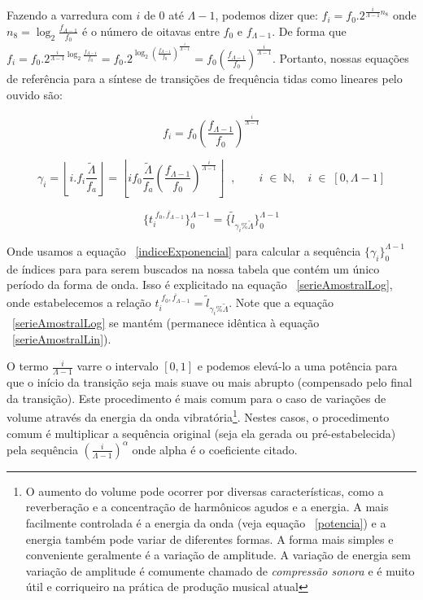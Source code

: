 Fazendo a varredura com $i$
de $0$ até $\Lambda-1$, podemos dizer que: $f_i=f_0 . 2^{\frac{i}{\Lambda-1} n_8}$ onde 
$n_8=\log_2\frac{f_{\Lambda-1}}{f_0}$ é o número de oitavas entre $f_0$ e $f_{\Lambda-1}$.
De forma que $f_i=f_0 . 2^{\frac{i}{\Lambda-1}\log_2\frac{f_{\Lambda-1}}{f_0}}=
f_0 . 2^{\log_2\left ( \frac{f_{\Lambda-1}}{f_0} \right )^{\frac{i}{\Lambda-1}}}=
f_0 \left ( \frac{f_{\Lambda-1}}{f_0} \right ) ^{\frac{i}{\Lambda -1}}$. Portanto,
nossas equações de referência para a síntese de transições de frequência tidas como
lineares pelo ouvido são:

\begin{equation}
f_i=f_0 \left ( \frac{f_{\Lambda-1}}{f_0} \right ) ^{\frac{i}{\Lambda -1}}
\end{equation}

\begin{equation}\label{indiceExponencial}
\gamma_i=\left \lfloor i . f_i\frac{\widetilde{\Lambda}}{f_a} \right \rfloor   =\left \lfloor i f_0 \frac{\widetilde{\Lambda}}{f_a} \left ( \frac{f_{\Lambda-1}}{f_0} \right ) ^{\frac{i}{\Lambda -1}} \right \rfloor   \;\; ,\quad \quad i \;\in\; \mathbb{N}, \quad i \;\in\; [0,\Lambda-1]
\end{equation}

\begin{equation}\label{serieAmostralLog}
\{t_i^{\;\overline{f_0,f_{\Lambda-1}}}\}_0^{\Lambda-1}=\{\widetilde{l}_{\gamma_i \% \widetilde{\Lambda}}\}_0^{\Lambda-1}
\end{equation}

Onde usamos a equação ~\ref{indiceExponencial} para calcular a sequência $\{\gamma_i\}_0^{\Lambda-1}$ de índices para para
serem buscados na nossa tabela que contém um único período da forma de onda.
Isso é explicitado na equação ~\ref{serieAmostralLog}, onde estabelecemos a relação
 $t_i^{\;\overline{f_0,f_{\Lambda-1}}}=\widetilde{l}_{\gamma_i \% \widetilde{\Lambda}}$.
Note que a equação ~\ref{serieAmostralLog} se mantém (permanece idêntica à equação ~\ref{serieAmostralLin}).

O termo $\frac{i}{\Lambda-1}$ varre o intervalo $[0,1]$ e podemos elevá-lo a uma potência
para que o início da transição seja mais suave ou mais abrupto (compensado pelo final
da transição). Este procedimento é mais comum para o caso de variações de volume através da energia
da onda vibratória\footnote{O aumento do volume pode ocorrer por diversas características, como
a reverberação e a concentração de harmônicos agudos e a energia. A mais facilmente controlada
é a energia da onda (veja equação ~\ref{potencia}) e a energia também pode variar de diferentes formas. A forma mais
simples e conveniente geralmente é a variação de amplitude. A variação de energia sem variação de
amplitude é comumente chamado de \emph{compressão sonora} e é muito útil e corriqueiro na prática
de produção musical atual}. Nestes casos, o procedimento comum é multiplicar a sequência original
(seja ela gerada ou pré-estabelecida) pela sequência $\left ( \frac{i}{\Lambda-1} \right )^\alpha$
onde alpha é o coeficiente citado.

